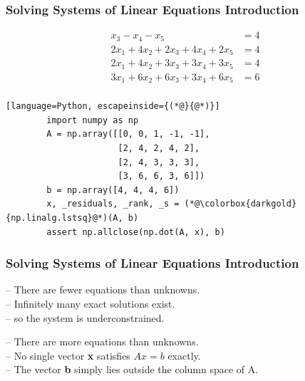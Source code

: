\documentclass[12pt]{beamer}
\newcommand{\FrameTitle}[2]{\frametitle{#1 \hfill \small\textnormal{\textcolor{midgray}{#2}}}}
\begin{document}
\begin{frame}[fragile]\FrameTitle{Solving Systems of Linear Equations}{Introduction}
    \vspace*{-2em}
    \begin{align*}
                         x_3 - x_4 - x_5 &= 4 \\
        2x_1 + 4x_2 + 2x_3 + 4x_4 + 2x_5 &= 4 \\
        2x_1 + 4x_2 + 3x_3 + 3x_4 + 3x_5 &= 4 \\
        3x_1 + 6x_2 + 6x_3 + 3x_4 + 6x_5 &= 6 \\
    \end{align*}

    \vspace*{-1.5em}

    \begin{lstlisting}[language=Python, escapeinside={(*@}{@*)}]
        import numpy as np
        A = np.array([[0, 0, 1, -1, -1],
                      [2, 4, 2, 4, 2],
                      [2, 4, 3, 3, 3],
                      [3, 6, 6, 3, 6]])
        b = np.array([4, 4, 4, 6])
        x, _residuals, _rank, _s = (*@\colorbox{darkgold}{np.linalg.lstsq}@*)(A, b)
        assert np.allclose(np.dot(A, x), b)\end{lstlisting}
\end{frame}

\begin{frame}[fragile]\FrameTitle{Solving Systems of Linear Equations}{Introduction}
    \begin{definition}[\color{orange!50}{Underdetermined systems (M < N)}]
        -- There are fewer equations than unknowns. \vspace*{2pt}\\
        -- Infinitely many exact solutions exist. \vspace*{2pt}\\
        -- so the system is underconstrained.
    \end{definition}
    \vspace*{3pt}
    \begin{definition}[\color{orange!50}{Overdetermined systems (M > N)}]
        -- There are more equations than unknowns. \vspace*{2pt}\\
        -- No single vector {\textrm{\textbf{x}}} satisfies $Ax = b$ exactly.  \vspace*{2pt}\\
        -- The vector \textbf{b} simply lies outside the column space of A.
    \end{definition}
\end{frame}
\end{document}
